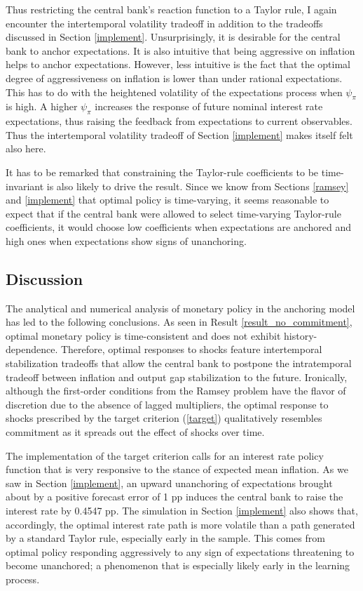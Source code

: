 \documentclass[11pt]{article}
\renewcommand{\[}{\begin{equation}}
\renewcommand{\]}{\end{equation}}
\def\ppFEunanchors{1 }
\def\ppMoveFFR{0.4547 }
\begin{document}
Thus restricting the central bank's reaction function to a Taylor rule, I again encounter the intertemporal volatility tradeoff in addition to the tradeoffs discussed in Section \ref{implement}. Unsurprisingly, it is desirable for the central bank to anchor expectations. It is also intuitive that being aggressive on inflation helps to anchor expectations. However, less intuitive is the fact that the optimal degree of aggressiveness on inflation is lower than under rational expectations. This has to do with the heightened volatility of the expectations process when $\psi_{\pi}$ is high. A higher $\psi_{\pi}$ increases the response of future nominal interest rate expectations, thus raising the feedback from expectations to current observables. Thus the intertemporal volatility tradeoff of Section \ref{implement} makes itself felt also here.

It has to be remarked that constraining the Taylor-rule coefficients to be time-invariant is also likely to drive the result. Since we know from Sections \ref{ramsey} and \ref{implement} that optimal policy is time-varying, it seems reasonable to expect that if the central bank were allowed to select time-varying Taylor-rule coefficients, it would choose low coefficients when expectations are anchored and high ones when expectations show signs of unanchoring. 

\subsection{Discussion}\label{discussion_results}

The analytical and numerical analysis of monetary policy in the anchoring model has led to the following conclusions. As seen in Result \ref{result_no_commitment}, optimal monetary policy is time-consistent and does not exhibit history-dependence. Therefore, optimal responses to shocks feature intertemporal stabilization tradeoffs that allow the central bank to postpone the intratemporal tradeoff between inflation and output gap stabilization to the future. Ironically, although the first-order conditions from the Ramsey problem have the flavor of discretion due to the absence of lagged multipliers, the optimal response to shocks prescribed by the target criterion (\ref{target}) qualitatively resembles commitment as it spreads out the effect of shocks over time. 

The implementation of the target criterion calls for an interest rate policy function that is very responsive to the stance of expected mean inflation. As we saw in Section \ref{implement}, an upward unanchoring of expectations brought about by a positive forecast error of \ppFEunanchors pp induces the central bank to raise the interest rate by \ppMoveFFR pp. The simulation in Section \ref{implement} also shows that, accordingly, the optimal interest rate path is more volatile than a path generated by a standard Taylor rule, especially early in the sample. This comes from optimal policy responding aggressively to any sign of expectations threatening to become unanchored; a phenomenon that is especially likely early in the learning process.
\end{document}

